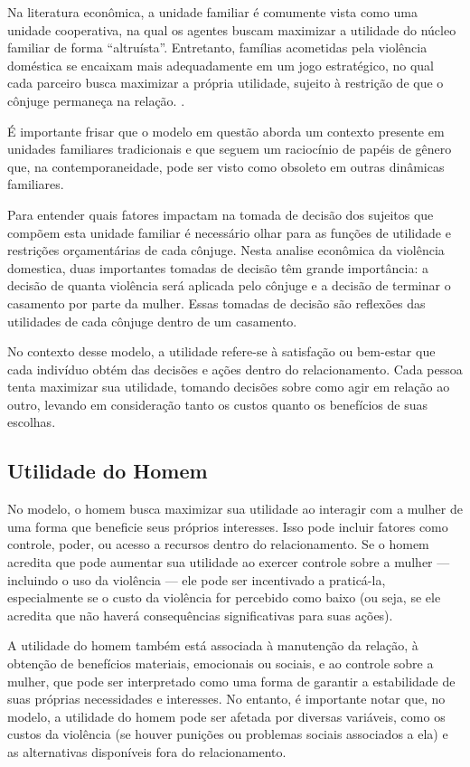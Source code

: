 Na literatura econômica, a unidade familiar é comumente vista como uma unidade cooperativa, na qual os agentes buscam maximizar a utilidade do núcleo familiar de forma ``altruísta''.  Entretanto, famílias acometidas pela violência doméstica se encaixam mais adequadamente em um jogo estratégico, no qual cada parceiro busca maximizar a própria utilidade, sujeito à restrição de que o cônjuge permaneça na relação. \cite{farmer1997economic}. 

É importante frisar que o modelo em questão aborda um contexto presente em unidades familiares tradicionais e que seguem um raciocínio de papéis de gênero que, na contemporaneidade, pode ser visto como obsoleto em outras dinâmicas familiares. 

Para entender quais fatores impactam na tomada de decisão dos sujeitos que compõem esta unidade familiar é necessário olhar para as funções de utilidade e restrições orçamentárias de cada cônjuge. Nesta analise econômica da violência domestica, duas importantes tomadas de decisão têm grande importância: a decisão de quanta violência será aplicada pelo cônjuge e a decisão de terminar o casamento por parte da mulher. Essas tomadas de decisão são reflexões das utilidades de cada cônjuge dentro de um casamento.  

No contexto desse modelo, a utilidade refere-se à satisfação ou bem-estar que cada indivíduo obtém das decisões e ações dentro do relacionamento. Cada pessoa tenta maximizar sua utilidade, tomando decisões sobre como agir em relação ao outro, levando em consideração tanto os custos quanto os benefícios de suas escolhas.
 
\subsection{Utilidade do Homem}

No modelo, o homem busca maximizar sua utilidade ao interagir com a mulher de uma forma que beneficie seus próprios interesses. Isso pode incluir fatores como controle, poder, ou acesso a recursos dentro do relacionamento. Se o homem acredita que pode aumentar sua utilidade ao exercer controle sobre a mulher — incluindo o uso da violência — ele pode ser incentivado a praticá-la, especialmente se o custo da violência for percebido como baixo (ou seja, se ele acredita que não haverá consequências significativas para suas ações).

A utilidade do homem também está associada à manutenção da relação, à obtenção de benefícios materiais, emocionais ou sociais, e ao controle sobre a mulher, que pode ser interpretado como uma forma de garantir a estabilidade de suas próprias necessidades e interesses. No entanto, é importante notar que, no modelo, a utilidade do homem pode ser afetada por diversas variáveis, como os custos da violência (se houver punições ou problemas sociais associados a ela) e as alternativas disponíveis fora do relacionamento.

